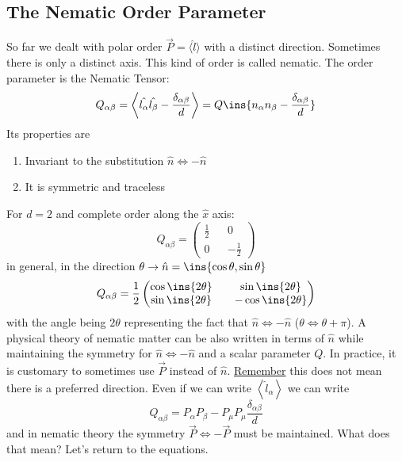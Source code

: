 \subsection{The Nematic Order Parameter}
So far we dealt with polar order \(\vec{P} = \langle\hat l\rangle\) with a distinct direction. Sometimes there is only a distinct axis. This kind of order is called nematic. The order parameter is the Nematic Tensor:
\begin{equation}
    Q_{\alpha\beta} = \left\langle\hat{l_\alpha}\hat{l_\beta}-\frac{\delta_{\alpha\beta}}{d}\right\rangle = Q\ins{n_\alpha n_\beta-\frac{\delta_{\alpha\beta}}{d}}
\end{equation}
Its properties are
\begin{enumerate}
    \item Invariant to the substitution \(\hat{n} \iff -\hat{n}\)
    \item It is symmetric and traceless
\end{enumerate}
For \(d=2\) and complete order along the \(\hat{x}\) axis:
\begin{equation}
    Q_{\alpha\beta} = \begin{pmatrix}
        \frac{1}{2} && 0 \\ 0 && -\frac{1}{2}
    \end{pmatrix}
\end{equation}
in general, in the direction \(\theta \rightarrow \hat{n}=\ins{\cos\theta,\sin\theta}\)
\begin{equation}
    Q_{\alpha\beta} = \frac{1}{2}\begin{pmatrix}
        \cos\ins{2\theta} && \sin\ins{2\theta} \\ \sin\ins{2\theta} && -\cos\ins{2\theta}
    \end{pmatrix}
\end{equation}
with the angle being \(2\theta\) representing the fact that \(\hat{n}\iff-\hat{n}\) (\(\theta\iff\theta+\pi\)). A physical theory of nematic matter can be also written in terms of \(\hat{n}\) while maintaining the symmetry for \(\hat{n}\iff-\hat{n}\) and a scalar parameter \(Q\). In practice, it is customary to sometimes use \(\vec{P}\) instead of \(\hat{n}\). \underline{Remember} this does not mean there is a preferred direction. Even if we can write \(\left\langle\hat{l}_\alpha\right\rangle\) we can write
\begin{equation}
    Q_{\alpha\beta} = P_\alpha P_\beta -P_\mu P_\mu \frac{\delta_{\alpha\beta}}{d}
\end{equation}
and in nematic theory the symmetry \(\vec{P}\iff-\vec{P}\) must be maintained. What does that mean? Let's return to the equations.
